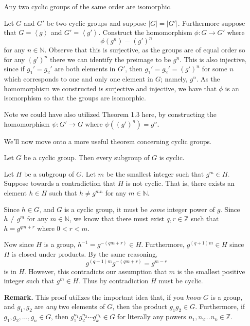    \begin{thm}
        Any two cyclic groups of the same order are isomorphic.
    \end{thm}

    \begin{prf}
        Let $G$ and $G'$ be two cyclic groups and suppose $|G| =
        |G'|$. Furthermore suppose that $G = \left< g\right>$ and $G'
        = \left< g' \right>$. Construct the homomorphism $\phi: G \to
        G'$ where 
        \[
            \phi(g^n) = (g')^n
        \]
        for any $n \in \mathbb{N}$. Observe that this is surjective, as
        the groups are of equal order so for any $(g')^n$ there we can
        identify the preimage to be $g^n$. This is also injective,
        since if $g_1' = g_2'$ are both elements in $G'$, then $g_1' =
        g_2' = (g')^n$ for some $n$ which corresponds to one and only
        one element in $G$; namely, $g^n$.
        As the homomorphism we constructed is surjective and
        injective, we have that $\phi$ is an isomorphism so that the
        groups are isomorphic.

        Note we could have also utilized Theorem 1.3 here, by constructing
        the homomorphism $\psi: G' \to G$ where $\psi((g')^n) = g^n$.

    \end{prf}

    We'll now move onto a more useful theorem concerning cyclic groups.

    \begin{thm}
        Let $G$ be a cyclic group. Then every subgroup of $G$ is cyclic.
    \end{thm}

    \begin{prf}
        Let $H$ be a subgroup of $G$.
        Let $m$ be the smallest integer such that $g^m \in H$. Suppose
        towards a contradiction that $H$ is not cyclic. That is, there
        exists an element $h \in H$ such that $h \ne g^{mn}$ for any
        $m \in \mathbb{N}$. 
        
        Since $h \in G$, and $G$ is a cyclic group, it must be \textit{some}
        integer power of $g$. Since $h \ne g^m$ for any $m \in
        \mathbb{N}$, 
        we know that
        there must exist $q, r \in \mathbb{Z}$ such that $h
        = g^{qm + r}$ where $0 < r < m$. 

        Now since $H$ is a group, $h^{-1} = g^{-(qm + r)} \in H$.
        Furthermore, $g^{(q+1)m} \in H$ since $H$ is closed under
        products. By the same reasoning,
        \[
            g^{(q+1)m}g^{-(qm + r)} = g^{m-r}
        \]
        is in $H$. However, this contradicts our assumption that $m$
        is the smallest positive integer such that $g^m \in H$. Thus
        by contradiction $H$ must be cyclic. 
    \end{prf}
    \textbf{Remark.}
    This proof utilizes the important idea that, if you \textit{know} $G$ is
    a group, and $g_1, g_2$ are \textit{any} two elements of $G$, then
    the product $g_1g_2 \in G$. Furthermore, if $g_1, g_2, \dots, g_n
    \in G$, then $g_1^{n_1}g_2^{n_2}\cdots g_k^{n_k} \in G$ for
    literally any powers $n_1, n_2 \dots n_k \in \mathbb{Z}$. 
    
